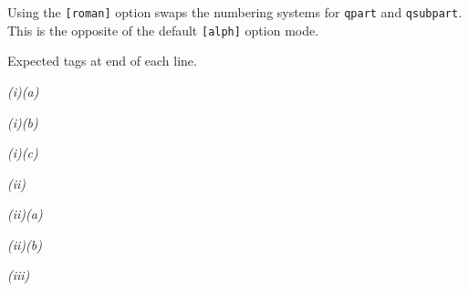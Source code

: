 \documentclass[a4paper,12pt]{article}
\begin{document}
Using the \verb|[roman]| option swaps the numbering systems for \verb|qpart| and \verb|qsubpart|. This is the opposite of the default \verb|[alph]| option mode.

Expected tags at end of each line.

\begin{question}
\qpart\qsubpart
\lipsum[1][1-4] \emph{(i)(a)}

\qsubpart
\lipsum[1][5-6] \emph{(i)(b)}

\qsubpart
\lipsum[1][7] \emph{(i)(c)}

\qpart
\lipsum[2][1-3] \emph{(ii)}

\qsubpart
\lipsum[2][4-5] \emph{(ii)(a)}

\qsubpart
\lipsum[2][6-8] \emph{(ii)(b)}

\qpart
\lipsum[3][1] \emph{(iii)}
\end{question}
\end{document}
